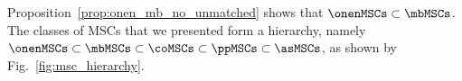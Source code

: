 
Proposition~\ref{prop:onen_mb_no_unmatched} shows that $\onenMSCs \subset \mbMSCs$. The classes of MSCs that we presented form a hierarchy, namely $\onenMSCs \subset \mbMSCs \subset \coMSCs \subset \ppMSCs \subset \asMSCs$, as shown by Fig.~\ref{fig:msc_hierarchy}.


